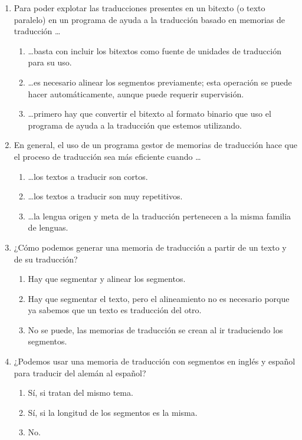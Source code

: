 \begin{enumerate}
\item Para poder explotar las traducciones presentes en un bitexto (o texto paralelo) en un programa de ayuda a la traducción basado en memorias de traducción \ldots \begin{enumerate} \item \ldots basta con incluir los bitextos como fuente de unidades de traducción para su uso. \item \ldots es necesario alinear los segmentos previamente; esta operación se puede hacer automáticamente, aunque puede requerir supervisión. \item \ldots primero hay que convertir el bitexto al formato binario que uso el programa de ayuda a la traducción que estemos utilizando. \end{enumerate} 

\item En general, el uso de un programa gestor de memorias de traducción hace que el proceso de traducción sea más eficiente cuando \ldots\begin{enumerate} \item \ldots los textos a traducir son cortos. \item \ldots los textos a traducir son muy repetitivos. \item \ldots la lengua origen y meta de la traducción pertenecen a la misma familia de lenguas. \end{enumerate} 

\item ¿Cómo podemos generar una memoria de traducción a partir de un texto y de su traducción? \begin{enumerate} \item Hay que segmentar y alinear los segmentos. \item Hay que segmentar el texto, pero el alineamiento no es necesario porque ya sabemos que un texto es traducción del otro. \item No se puede, las memorias de traducción se crean al ir traduciendo los segmentos. \end{enumerate} 

\item ¿Podemos usar una memoria de traducción con segmentos en inglés y español para traducir del alemán al español? \begin{enumerate} \item Sí, si tratan del mismo tema. \item Sí, si la longitud de los segmentos es la misma. \item No. \end{enumerate} \end{enumerate} 

